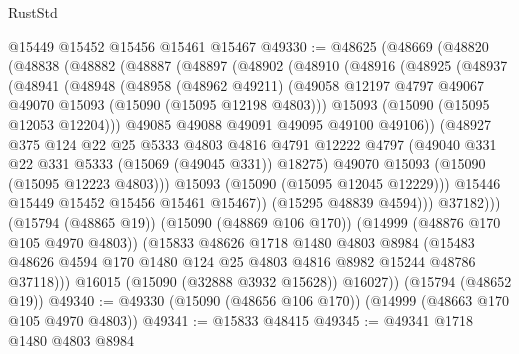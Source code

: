 \begin{lexlean}{RustStd}
\begin{coremodule}
    @15449
    @15452
    @15456
    @15461
    @15467
@49330 := @48625
    (@48669
      (@48820
        (@48838
          (@48882
            (@48887
              (@48897
                (@48902
                  (@48910
                    (@48916
                      (@48925
                        (@48937
                          (@48941
                            (@48948
                              (@48958
                                (@48962 @49211)
                                (@49058
                                  @12197
                                  @4797
                                  @49067
                                  @49070
                                  @15093
                                  (@15090 (@15095 @12198 @4803)))
                                @15093
                                (@15090 (@15095 @12053 @12204)))
                              @49085
                              @49088
                              @49091
                              @49095
                              @49100
                              @49106))
                          (@48927
                            @375
                            @124
                            @22
                            @25
                            @5333
                            @4803
                            @4816
                            @4791
                            @12222
                            @4797
                            (@49040 @331 @22 @331 @5333 (@15069 (@49045 @331)) @18275)
                            @49070
                            @15093
                            (@15090 (@15095 @12223 @4803)))
                          @15093
                          (@15090 (@15095 @12045 @12229)))
                        @15446
                        @15449
                        @15452
                        @15456
                        @15461
                        @15467))
                    (@15295 @48839 @4594)))
                @37182)))
          (@15794 (@48865 @19))
          (@15090 (@48869 @106 @170))
          (@14999 (@48876 @170 @105 @4970 @4803))
          (@15833
            @48626
            @1718
            @1480
            @4803
            @8984
            (@15483 @48626 @4594 @170 @1480 @124 @25 @4803 @4816 @8982 @15244 @48786 @37118)))
        @16015
        (@15090 (@32888 @3932 @15628))
        @16027))
    (@15794 (@48652 @19))
@49340 := @49330 (@15090 (@48656 @106 @170)) (@14999 (@48663 @170 @105 @4970 @4803))
@49341 := @15833 @48415
@49345 := @49341 @1718 @1480 @4803 @8984

\end{coremodule}
\end{lexlean}
